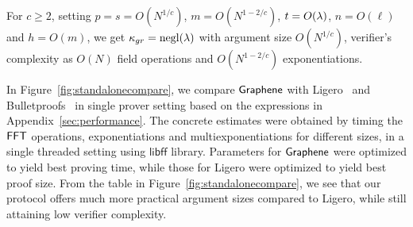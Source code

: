 
\noindent For $c\geq 2$, setting $p=s=O(N^{1/c})$, $m=O(N^{1-2/c})$, $t=O(\lambda)$,
$n=O(\ell)$ and $h=O(m)$, we get $\kappa_{gr}=\mathrm{negl}(\lambda)$ with argument size
$O(N^{1/c})$, verifier's complexity as $O(N)$ field operations and
$O(N^{1-2/c})$ exponentiations. 

\begin{table*}[htp]
\centering
{}
\caption{Comparison of Graphene(G), Ligero(L) and Bulletproofs(B) in single
prover setting for 80 bits of security}
\label{fig:standalonecompare}
\end{table*}

\noindent In Figure~\ref{fig:standalonecompare}, we compare
$\textsf{Graphene}$ with Ligero~\cite{ligero} and Bulletproofs~\cite{bulletproofs} in
single prover setting based on the expressions in Appendix~\ref{sec:performance}. The concrete estimates were obtained by timing the $\mathsf{FFT}$
operations, exponentiations and multiexponentiations for different sizes, in a
single threaded setting using $\mathsf{libff}$ library. Parameters for $\textsf{Graphene}$ were optimized to yield best
proving time, while those for Ligero were optimized to yield best proof size.
From the table in Figure~\ref{fig:standalonecompare}, we see that our protocol offers much more practical argument
sizes compared to Ligero, while still attaining low verifier complexity. 



